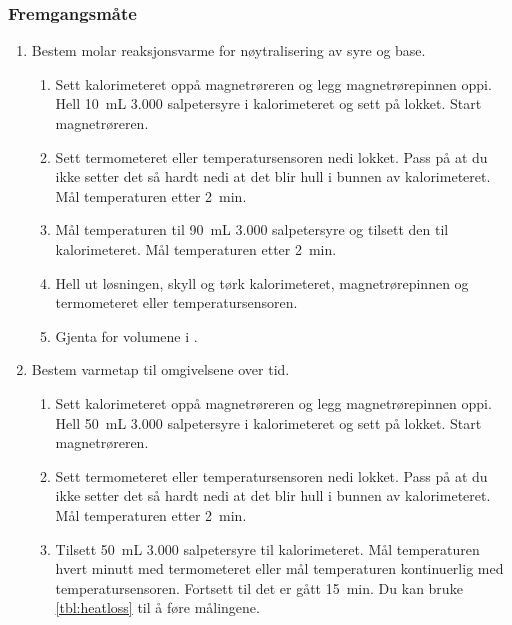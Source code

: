 	\subsubsection{Fremgangsmåte}
	\begin{enumerate}
		
		\item Bestem molar reaksjonsvarme for nøytralisering av syre og base.
		\begin{enumerate}
			\item Sett kalorimeteret oppå magnetrøreren og legg magnetrørepinnen oppi.
			Hell \SI{10}{\milli\liter} \SI{3.000}{\molar} salpetersyre i kalorimeteret og sett på lokket.
			Start magnetrøreren.
			\label{lst:firststep}
			
			\item Sett termometeret eller temperatursensoren nedi lokket.
			Pass på at du ikke setter det så hardt nedi at det blir hull i bunnen av kalorimeteret.
			Mål temperaturen etter \SI{2}{\minute}.
			
			\item Mål temperaturen til \SI{90}{\milli\liter} \SI{3.000}{\molar} salpetersyre og tilsett den til kalorimeteret.
			Mål temperaturen etter \SI{2}{\minute}.
			
			\item Hell ut løsningen, skyll og tørk kalorimeteret, magnetrørepinnen og termometeret eller temperatursensoren. \label{lst:fourthstep}
			
			\item Gjenta  for volumene i .
		\end{enumerate}
	
		\item Bestem varmetap til omgivelsene over tid.
		\begin{enumerate}
			\item Sett kalorimeteret oppå magnetrøreren og legg magnetrørepinnen oppi.
			Hell \SI{50}{\milli\liter} \SI{3.000}{\molar} salpetersyre i kalorimeteret og sett på lokket.
			 Start magnetrøreren.
			
			\item Sett termometeret eller temperatursensoren nedi lokket.
			Pass på at du ikke setter det så hardt nedi at det blir hull i bunnen av kalorimeteret.
			Mål temperaturen etter \SI{2}{\minute}.
			
			\item Tilsett \SI{50}{\milli\liter} \SI{3.000}{\molar} salpetersyre til kalorimeteret.
			Mål temperaturen hvert minutt med termometeret eller mål temperaturen kontinuerlig med temperatursensoren.
			Fortsett til det er gått \SI{15}{\minute}.
			Du kan bruke \cref{tbl:heatloss} til å føre målingene.
			

\end{enumerate}
\end{enumerate}
